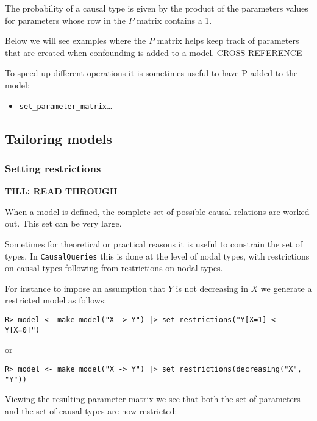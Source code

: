 \documentclass[
  11pt,
  article]{jss}
\providecommand{\tightlist}{%
  \setlength{\itemsep}{0pt}\setlength{\parskip}{0pt}}\usepackage{longtable,booktabs,array}
\begin{document}
The probability of a causal type is given by the product of the
parameters values for parameters whose row in the \(P\) matrix contains
a 1.

Below we will see examples where the \(P\) matrix helps keep track of
parameters that are created when confounding is added to a model. CROSS
REFERENCE

To speed up different operations it is sometimes useful to have P added
to the model:

\begin{itemize}
\tightlist
\item
  \texttt{set\_parameter\_matrix}\ldots{}
\end{itemize}

\hypertarget{tailoring-models}{%
\subsection{Tailoring models}\label{tailoring-models}}

\hypertarget{restrictions}{%
\subsubsection{Setting restrictions}\label{restrictions}}

\textbf{TILL: READ THROUGH}

When a model is defined, the complete set of possible causal relations
are worked out. This set can be very large.

Sometimes for theoretical or practical reasons it is useful to constrain
the set of types. In \texttt{CausalQueries} this is done at the level of
nodal types, with restrictions on causal types following from
restrictions on nodal types.

For instance to impose an assumption that \(Y\) is not decreasing in
\(X\) we generate a restricted model as follows:

\begin{verbatim}
R> model <- make_model("X -> Y") |> set_restrictions("Y[X=1] < Y[X=0]")
\end{verbatim}

or

\begin{verbatim}
R> model <- make_model("X -> Y") |> set_restrictions(decreasing("X", "Y"))
\end{verbatim}

Viewing the resulting parameter matrix we see that both the set of
parameters and the set of causal types are now restricted:
\end{document}
